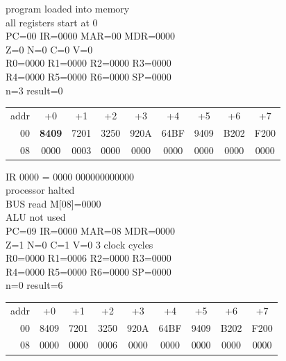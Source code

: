 \noindent\begin{tcolorbox}[stepbox, title={Before: step 0 \hfill program loaded}]
\textcolor{dim}{program loaded into memory}\\
\textcolor{dim}{all registers start at 0}\\
PC=00 IR=0000 MAR=00 MDR=0000\\
Z=0 N=0 C=0 V=0\\
R0=0000 R1=0000 R2=0000 R3=0000\\
R4=0000 R5=0000 R6=0000 SP=0000\\
\textcolor{dim}{n=3  result=0}\\[1pt]
{\setlength{\tabcolsep}{1.6pt}\begin{tabular}{@{}r*{8}{c}@{}}
\textcolor{dim}{addr} & \textcolor{dim}{+0} & \textcolor{dim}{+1} & \textcolor{dim}{+2} & \textcolor{dim}{+3} & \textcolor{dim}{+4} & \textcolor{dim}{+5} & \textcolor{dim}{+6} & \textcolor{dim}{+7}\\
\textcolor{dim}{00} & \cellcolor{pcc}\textbf{8409} & 7201 & 3250 & 920A & 64BF & 9409 & B202 & F200\\
\textcolor{dim}{08} & 0000 & \cellcolor{datac}0003 & \cellcolor{datac}0000 & 0000 & 0000 & 0000 & 0000 & 0000\\
\end{tabular}}
\end{tcolorbox}\hfill\begin{tcolorbox}[stepbox, title={After: step 19 \hfill HALT}]
\textcolor{dim}{IR} 0000 = 0000 000000000000\\
processor halted\\
\textcolor{dim}{BUS} read M[08]=0000\\
\textcolor{dim}{ALU} \textcolor{dim}{not used}\\
PC=09 IR=0000 MAR=08 MDR=0000\\
Z=1 N=0 C=1 V=0 \hfill \textcolor{dim}{3 clock cycles}\\
R0=0000 R1=0006 R2=0000 R3=0000\\
R4=0000 R5=0000 R6=0000 SP=0000\\
\textcolor{dim}{n=0  result=6}\\[1pt]
{\setlength{\tabcolsep}{1.6pt}\begin{tabular}{@{}r*{8}{c}@{}}
\textcolor{dim}{addr} & \textcolor{dim}{+0} & \textcolor{dim}{+1} & \textcolor{dim}{+2} & \textcolor{dim}{+3} & \textcolor{dim}{+4} & \textcolor{dim}{+5} & \textcolor{dim}{+6} & \textcolor{dim}{+7}\\
\textcolor{dim}{00} & 8409 & 7201 & 3250 & 920A & 64BF & 9409 & B202 & F200\\
\textcolor{dim}{08} & 0000 & \cellcolor{datac}0000 & \cellcolor{datac}0006 & 0000 & 0000 & 0000 & 0000 & 0000\\
\end{tabular}}
\end{tcolorbox}\par\vspace{3pt}
